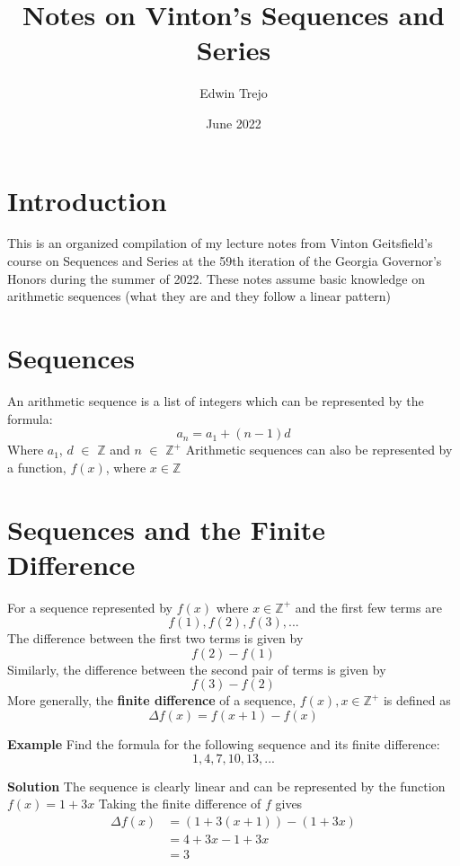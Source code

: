 \documentclass{article}
\title{Notes on Vinton's Sequences and Series}
\author{Edwin Trejo}
\date{June 2022}
\begin{document}
\maketitle

\section{Introduction}

This is an organized compilation of my lecture notes from Vinton Geitsfield's course on Sequences and Series at the 59th iteration of the Georgia Governor's Honors during the summer of 2022. 
These notes assume basic knowledge on arithmetic sequences (what they are and they follow a linear pattern)

\section{Sequences}
An arithmetic sequence is a list of integers which can be represented by the formula:
\[a_n = a_1 + (n - 1)d\] Where \(a_1\), \(d\) \(\in\) \(\mathbb{Z}\) and \(n\) \(\in\) \(\mathbb{Z}^+\)
\newline
Arithmetic sequences can also be represented by a function, \(f(x)\), where \(x\in\mathbb{Z}\)

\section{Sequences and the Finite Difference}
For a sequence represented by \(f(x)\) where \(x \in \mathbb{Z}^+\) and the first few terms are \[f(1), f(2), f(3), ...\]
The difference between the first two terms is given by \[f(2) - f(1)\] 
Similarly, the difference between the second pair of terms is given by \[f(3) - f(2)\]
More generally, the \textbf{finite difference} of a sequence, \(f(x), x \in \mathbb{Z}^+\) is defined as
\begin{equation} \label{eq:1}
    \Delta f(x) = f(x + 1) - f(x)
\end{equation}

\textbf{Example}
Find the formula for the following sequence and its finite difference: \[1,4,7,10,13,...\]

\textbf{Solution} 
The sequence is clearly linear and can be represented by the function \(f(x) = 1+3x\)
Taking the finite difference of \(f\) gives
\begin{align*}
    \Delta f(x) & = (1+3(x+1)) - (1 + 3x) \\
    & = 4+3x - 1+3x \\
    & = 3
\end{align*}
\end{document}
